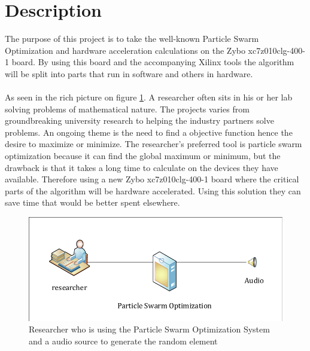 \section{Description}\label{sc:problemdescription}
The purpose of this project is to take the well-known Particle Swarm Optimization \cite{Blondin2009} and hardware acceleration calculations on the Zybo xc7z010clg-400-1 board. By using this board and the accompanying Xilinx tools the algorithm will be split into parts that run in software and others in hardware. 
\\\\
As seen in the rich picture on figure \ref{fig:descriptiondiagram}. A researcher often sits in his or her lab solving problems of mathematical nature. The projects varies from groundbreaking university research to helping the industry partners solve problems. An ongoing theme is the need to find a objective function hence the desire to maximize or minimize.
The researcher's preferred tool is particle swarm optimization because it can find the global maximum or minimum, but the drawback is that it takes a long time to calculate on the devices they have available. Therefore using a new Zybo xc7z010clg-400-1 board where the critical parts of the algorithm will be hardware accelerated. Using this solution they can save time that would be better spent elsewhere.

\begin{figure}[!h]
	\centering
	\includegraphics[width=0.7\linewidth]{diagram/description_diagram}
	\caption{Researcher who is using the Particle Swarm Optimization System and a audio source to generate the random element }
	\label{fig:descriptiondiagram}
\end{figure}
